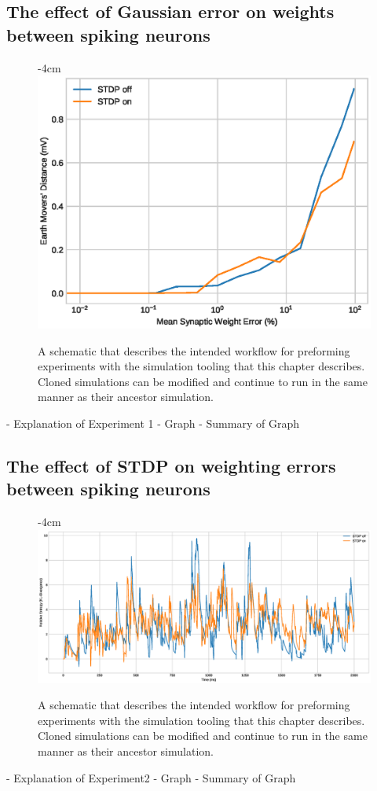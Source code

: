 \subsection{The effect of Gaussian error on weights between spiking neurons}
\begin{figure}[h!]
    \centering
    \addtolength{\leftskip} {-4cm}
    \addtolength{\rightskip}{-4cm}
    \includegraphics[width=0.7\linewidth]{figures/graphs/RESULT1.eps}
    \caption[Workflow of project simulation]{A schematic that describes the intended workflow for preforming experiments with the simulation tooling that this chapter describes. Cloned simulations can be modified and continue to run in the same manner as their ancestor simulation.}
    \label{fig:RES1}
\end{figure}
- Explanation of Experiment 1
- Graph
- Summary of Graph
\FloatBarrier
\subsection{The effect of STDP on weighting errors between spiking neurons}
\begin{figure}[h!]
    \centering
    \addtolength{\leftskip} {-4cm}
    \addtolength{\rightskip}{-4cm}
    \includegraphics[width=1.6\linewidth]{figures/graphs/RESULT2.eps}
    \caption[Workflow of project simulation]{A schematic that describes the intended workflow for preforming experiments with the simulation tooling that this chapter describes. Cloned simulations can be modified and continue to run in the same manner as their ancestor simulation.}
    \label{fig:RES2}
\end{figure}
- Explanation of Experiment2
- Graph
- Summary of Graph
\FloatBarrier

